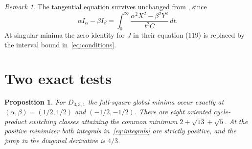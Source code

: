 \documentclass[11pt,a4paper]{article}
\newtheorem{proposition}[theorem]{Proposition}
\theoremstyle{remark}
\newtheorem{remark}[theorem]{Remark}
\newcommand{\dd}{\,dt}
\begin{document}
\begin{remark}
The tangential equation survives unchanged from
\cite[equation (118)]{HuangPereyra2026}, since
\[
 \alpha I_\alpha-\beta I_\beta
 =\int_0^\infty\frac{\alpha^2X^2-\beta^2Y^2}{t^2C}\dd .
\]
At singular minima the zero identity for $J$ in their equation (119)
is replaced by the interval bound in~\eqref{eq:conditions}.
\end{remark}

\section{Two exact tests}

\begin{proposition}\label{prop:331}
For $D_{3,3,1}$ the full-square global minima occur exactly at
$(\alpha,\beta)=(1/2,1/2)$ and $(-1/2,-1/2)$.
There are eight oriented cycle-product switching classes attaining
the common minimum $2+\sqrt{13}+\sqrt5$.
At the positive minimizer both integrals in~\eqref{eq:integrals}
are strictly positive, and the jump in the diagonal derivative is $4/3$.
\end{proposition}
\end{document}
